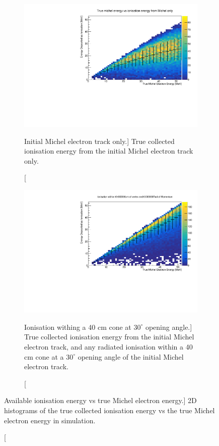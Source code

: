 \begin{figure}
	\centering

	\begin{subfigure}[b]{\textwidth}
		\includegraphics[clip, trim = 0cm 0cm 0cm 1cm, width=\textwidth]{figures/michel_track_only.pdf}
		\caption
		[Initial Michel electron track only.]
		{True collected ionisation energy from the initial Michel electron track
		only.}
		\label{fig:track_only}
	\end{subfigure}

	\vspace{5mm}

	\begin{subfigure}[b]{\textwidth}
		\includegraphics[clip, trim = 0cm 0cm 0cm 1cm, width=\textwidth]{figures/cone_reco.pdf}
		\caption
		[Ionisation withing a 40 cm cone at $30^\circ$ opening angle.]
		{True collected ionisation energy from the initial Michel electron track,
		and any radiated ionisation within a 40 cm cone at a $30^\circ$ opening
		angle of the initial Michel electron track.}
		\label{fig:cone_reco}
	\end{subfigure}

	\caption
	[Available ionisation energy vs true Michel electron energy.]
	{2D histograms of the true collected ionisation energy vs the true Michel
	electron energy in \protodune{} simulation.}

	\label{fig:michel_track_only}

\end{figure}

